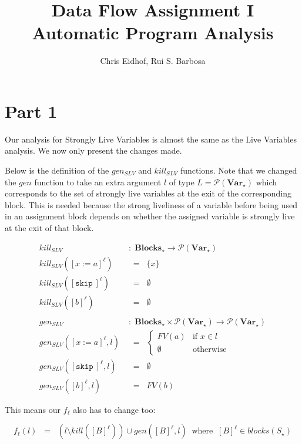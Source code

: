 \documentclass[a4wide,12pt]{article}
\def\eq{\;\; = \;\;}
\def\pset#1{\mathcal{P}(#1)}
\def\Blocks{\mathbf{Blocks}}
\def\Var {\mathbf{Var}}
\def\skip {\texttt{skip}\ }
\begin{document}
\author{Chris Eidhof, Rui S. Barbosa}
\title{Data Flow Assignment I \\ Automatic Program Analysis}
 
\maketitle
 
\section{Part 1}
 
Our analysis for Strongly Live Variables is almost the same as the Live
Variables analysis. We now only present the changes made.

Below is the definition of the $gen_{SLV}$ and $kill_{SLV}$ functions.
Note that we changed the $gen$ function to take an
extra argument $l$ of type $L = \pset{\Var_\star}$ which
corresponds to the set of strongly live variables at the exit of the corresponding block.
This is needed because the strong liveliness of a variable before
being used in an assignment block
depends on whether the assigned variable is strongly live at the exit of that block.
 
\begin{align*}
kill_{SLV} & \; : \; \Blocks_\star \to \pset{\Var_\star} \\
kill_{SLV}([x:=a]^\ell) & \eq \{x\} \\
kill_{SLV}([\skip]^\ell) & \eq \emptyset\\
kill_{SLV}([b]^\ell) & \eq \emptyset \\
\\
gen_{SLV} & \; : \; \Blocks_\star \times \pset{\Var_\star} \to \pset{\Var_\star} \\
gen_{SLV}([x:=a]^\ell,l) & \eq
         \begin{cases}
          FV(a) & \text{if $x \in l$} \\
          \emptyset & \text{otherwise}
         \end{cases} \\
gen_{SLV}([\skip]^\ell,l) & \eq \emptyset\\
gen_{SLV}([b]^\ell,l) & \eq FV(b)
\end{align*}
 
This means our $f_\ell$ also has to change too:
 
\[ f_\ell(l) \eq (l \setminus kill([B]^\ell)) \cup gen([B]^\ell, l) \;\; \text{where} \;\; [B]^\ell
\in blocks(S_\star)
\]
 
\end{document}
